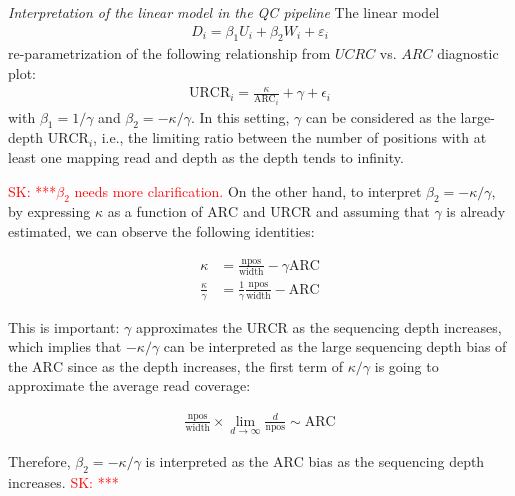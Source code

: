 \documentclass{bmcart}
\newcommand{\SK}[1]{\textcolor{red}{SK: #1}}
\begin{document}

\textit{Interpretation of the linear model in the QC pipeline}
The linear model
\begin{align*}
  D_i = \beta_1 U_i + \beta_2 W_i+\varepsilon_i
\end{align*}
 re-parametrization of the following relationship from $UCRC$ vs. $ARC$ diagnostic plot:
\begin{align}
  \mbox{URCR}_i = \frac{\kappa}{\mbox{ARC}_i} + \gamma + \epsilon_i
\label{mod}
\end{align}
with $\beta_1 = 1 / \gamma$ and $\beta_2 = - \kappa / \gamma$. In this
setting, $\gamma$ can be considered as the large-depth
$\mbox{URCR}_i$, i.e., the limiting ratio between the number of positions with at least one mapping read
and depth as the depth tends to infinity. 

\SK{***$\beta_2$ needs more clarification. }
On the other hand, to
interpret $\beta_2 = - \kappa / \gamma $, by expressing $\kappa$ as a
function of $\mbox{ARC}$ and $\mbox{URCR}$ and assuming that $\gamma$
is already estimated, we can observe the following identities:

\begin{align*}
  \kappa &= \frac{\mbox{npos}}{\mbox{width}} - \gamma \mbox{ARC} \\
  \frac{\kappa}{\gamma} &= \frac{1}{\gamma} \frac{\mbox{npos}}{\mbox{width}} - \mbox{ARC} 
\end{align*}

This is important: $\gamma$ approximates the $\mbox{URCR}$ as the
sequencing depth increases, which implies that $- \kappa / \gamma$ can
be interpreted as the large sequencing depth bias of the $\mbox{ARC}$
since as the depth increases, the first term of $\kappa / \gamma$ is
going to approximate the average read coverage:

\begin{align*}
  \frac{\mbox{npos}}{\mbox{width}} \times \lim_{d \rightarrow
    \infty} \frac{d }{\mbox{npos}} \sim \mbox{ARC} 
\end{align*}

Therefore, $\beta_2 = - \kappa / \gamma$ is interpreted as the
$\mbox{ARC}$ bias as the sequencing depth increases.
\SK{***}
\end{document}
